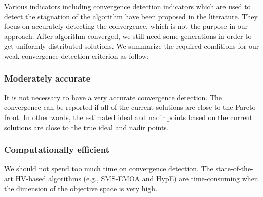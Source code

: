 \documentclass[conference]{IEEEtran}
\begin{document}
%
%
%
Various indicators including convergence detection indicators which are used to detect the stagnation of the algorithm 
have been proposed in the literature\cite{convergenceDetection:1, convergenceDetection:LSSC, 
convergenceDetection:OCD, convergenceDetection:OFCDandOCD, convergenceDetection:convergenceMetric, 
convergenceDetection:maxCD, convergenceDetection:online}. 
They focus on accurately detecting the convergence, which is not the purpose in our approach.
After algorithm converged, we still need some generations in order to
get uniformly distributed solutions. 
We summarize the required conditions for our weak convergence detection criterion as follow:
\subsubsection{Moderately accurate} It is not necessary to have a very accurate convergence detection. 
The convergence can be reported if all of the current solutions are close to the Pareto front.
In other words, the estimated ideal and nadir points based on the current solutions
are close to the true ideal and nadir points. 
\subsubsection{Computationally efficient} We should not spend too much time on convergence detection. 
The state-of-the-art HV-based algorithms (e.g., SMS-EMOA and HypE) 
are time-consuming when the dimension of the objective space is very high. 
\end{document}
